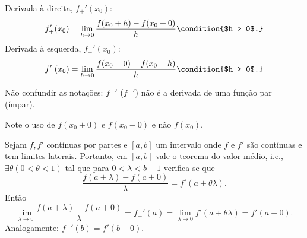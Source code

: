\begin{defi}
  Derivada à direita, $f_+'(x_0)$:
  \begin{dmath*}
    f_+'(x_0) = \lim_{h \to 0} \frac{f(x_0 + h) - f(x_0 + 0)}{h} \condition{$h >
    0$.}
  \end{dmath*}
  Derivada à esquerda, $f_-'(x_0)$:
  \begin{dmath*}
    f_-'(x_0) = \lim_{h \to 0} \frac{f(x_0 - 0) - f(x_0 - h)}{h} \condition{$h >
    0$.}
  \end{dmath*}
\end{defi}
\begin{obs}
  Não confundir as notações: $f_+'$ ($f_-'$) não é a derivada de uma função par
  (ímpar).
\end{obs}
\begin{obs}
  Note o uso de $f(x_0 + 0)$ e $f(x_0 - 0)$ e não $f(x_0)$.
\end{obs}

Sejam $f, f'$ contínuas por partes e $[a,b]$ um intervalo onde $f$ e $f'$ são
contínuas e tem limites laterais. Portanto, em $[a,b]$ vale o teorema do valor
médio, i.e., $\exists \theta (0 < \theta < 1)$ tal que para $0 < \lambda < b -
1$ verifica-se que
\begin{dmath*}
  \frac{f(a + \lambda) - f(a + 0)}{\lambda} = f'(a + \theta \lambda).
\end{dmath*}
Então
\begin{dmath*}
  \lim_{\lambda \to 0} \frac{f(a + \lambda) - f(a + 0)}{\lambda} = f_+'(a) =
  \lim_{\lambda \to 0} f'(a + \theta \lambda) = f'(a + 0).
\end{dmath*}
Analogamente: $f_-'(b) = f'(b - 0)$.

